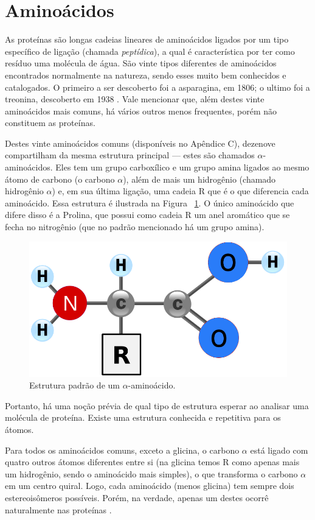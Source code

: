 \section*{Aminoácidos}
As proteínas são longas cadeias lineares de aminoácidos ligados por um tipo específico de ligação (chamada \textit{peptídica}), a qual é característica por ter como resíduo uma molécula de água. São vinte tipos diferentes de aminoácidos encontrados normalmente na natureza, sendo esses muito bem conhecidos e catalogados. O primeiro a ser descoberto foi a asparagina, em 1806; o ultimo foi a treonina, descoberto em 1938 \cite{bioquimicaLehninger}. Vale mencionar que, além destes vinte aminoácidos mais comuns, há vários outros menos frequentes, porém não constituem as proteínas.

Destes vinte aminoácidos comuns (disponíveis no Apêndice C), dezenove compartilham da mesma estrutura principal \cite{fidalgotese} --- estes são chamados $\alpha$-aminoácidos. Eles tem um grupo carboxílico e um grupo amina ligados ao mesmo átomo de carbono (o carbono $\alpha$), além de mais um hidrogênio (chamado hidrogênio $\alpha$) e, em sua última ligação, uma cadeia R que é o que diferencia cada aminoácido. Essa estrutura é ilustrada na Figura ~\ref{fig:amino}. O único aminoácido que difere disso é a Prolina, que possui como cadeia R um anel aromático que se fecha no nitrogênio (que no padrão mencionado há um grupo amina).

\begin{figure}[H]
	\begin{center}
		\includegraphics[width=0.35\linewidth]{secProteins/figures/amino.png}
	\end{center}
	\caption{Estrutura padrão de um $\alpha$-aminoácido.}
	\label{fig:amino}
\end{figure}

Portanto, há uma noção prévia de qual tipo de estrutura esperar ao analisar uma molécula de proteína. Existe uma estrutura conhecida e repetitiva para os átomos.

Para todos os aminoácidos comuns, exceto a glicina, o carbono $\alpha$ está ligado com quatro outros átomos diferentes entre si (na glicina temos R como apenas mais um hidrogênio, sendo o aminoácido mais simples), o que transforma o carbono $\alpha$ em um centro quiral. Logo, cada aminoácido (menos glicina) tem sempre dois estereoisômeros possíveis. Porém, na verdade, apenas um destes ocorrê naturalmente nas proteínas \cite{bioquimicaLehninger}.

